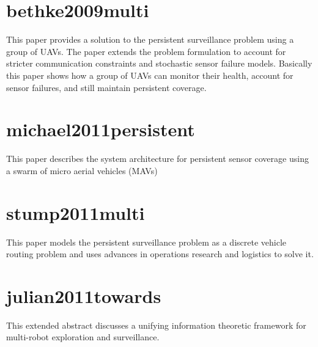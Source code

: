 \documentclass{article}
\begin{document}
\section{bethke2009multi~\cite{bethke2009multi}}

This paper provides a solution to the persistent surveillance problem using a
group of UAVs. The paper extends the problem formulation to account for
stricter communication constraints and stochastic sensor failure models.
Basically this paper shows how a group of UAVs can monitor their health,
account for sensor failures, and still maintain persistent coverage.


\section{michael2011persistent~\cite{michael2011persistent}}

This paper describes the system architecture for persistent sensor coverage
using a swarm of micro aerial vehicles (MAVs)

\section{stump2011multi~\cite{stump2011multi}}

This paper models the persistent surveillance problem as a discrete vehicle
routing problem and uses advances in operations research and logistics to solve
it.

\section{julian2011towards~\cite{julian2011towards}}

This extended abstract discusses a unifying information theoretic framework for
multi-robot exploration and surveillance.

 
\end{document}
